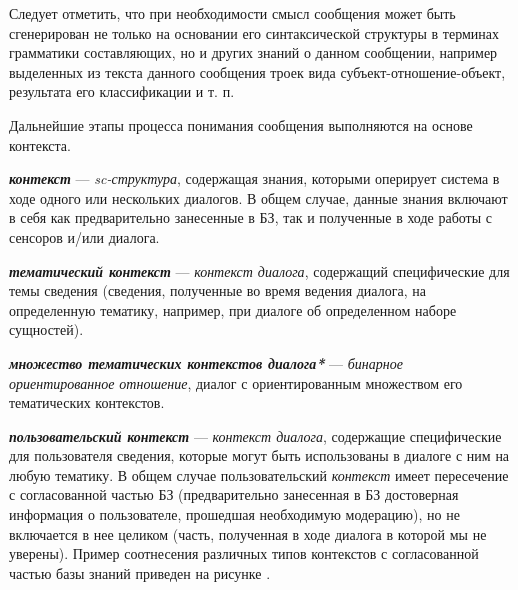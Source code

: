 Следует отметить, что при необходимости смысл сообщения может быть сгенерирован не только на основании его синтаксической структуры в терминах грамматики составляющих, но и других знаний о данном сообщении, например выделенных из текста данного сообщения троек вида субъект-отношение-объект, результата его классификации и т. п.

Дальнейшие этапы процесса понимания сообщения выполняются на основе контекста.

\textit{\textbf{контекст}} --- \textit{sc-структура}, содержащая знания, которыми оперирует система в ходе одного или нескольких диалогов.
В общем случае, данные знания включают в себя как предварительно занесенные в БЗ, так и полученные в ходе работы с сенсоров и/или диалога.

\begin{SCn}

    \begin{scnindent}
        \begin{scneqtoset}
        \end{scneqtoset}
    \end{scnindent}

\end{SCn}

\textit{\textbf{тематический контекст}} --- \textit{контекст диалога}, содержащий специфические для темы сведения (сведения, полученные во время ведения диалога, на определенную тематику, например, при диалоге об определенном наборе сущностей).

\textit{\textbf{множество тематических контекстов диалога*}} --- \textit{бинарное ориентированное отношение}, диалог с ориентированным множеством его тематических контекстов.

\textit{\textbf{пользовательский контекст}} --- \textit{контекст диалога}, содержащие специфические для пользователя сведения, которые могут быть использованы в диалоге с ним на любую тематику.
В общем случае пользовательский \textit{контекст} имеет пересечение с согласованной частью БЗ (предварительно занесенная в БЗ достоверная информация о пользователе, прошедшая необходимую модерацию), но не включается в нее целиком (часть, полученная в ходе диалога в которой мы не уверены).
Пример соотнесения различных типов контекстов с согласованной частью базы знаний приведен на рисунке \textit{}.

